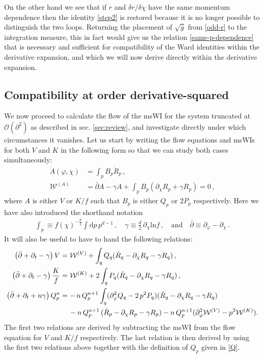 \documentclass[11pt]{book}
\numberwithin{equation}{chapter}
\begin{document}
On the other hand we see that if $\dot{r}$ and $\delta r/\delta\chi$ have the same momentum
dependence then the identity \eqref{step2} is restored because it is no longer possible
to distinguish the two loops.
Returning the placement of $\sqrt{\bar{g}}$ from \eqref{odd-r} to the integration measure,
this in fact would give us the relation \eqref{same-p-dependence} that is necessary and
sufficient for compatibility of the Ward identities within the derivative expansion,
and which we will now derive directly within the derivative expansion.


\subsection{Compatibility at order derivative-squared}\label{sec:compatibility-at-d2}

We now proceed to calculate the flow of the msWI for the system truncated
at $\mathcal{O}(\partial^2)$ as described in sec. \ref{sec:review},
and investigate directly under which circumstances it vanishes.
Let us start by writing the flow equations and msWIs for both $V$ and $K$ in the following form
so that we can study both cases simultaneously:
\begin{align}
	\label{flowA}
	\dot A(\varphi,\chi) &= \int_p B_p\dot R_p \,,\\
	\label{msWIA}
	\mathcal{W}^{(A)}&=\bar\partial A - \gamma A + \int_p B_p(\partial_\chi R_p + \gamma R_p)=0 \,,
\end{align}
where $A$ is either $V$ or $K/f$ such that $B_p$ is either $Q_p$ or $2 P_p$ respectively.
Here we have also introduced the shorthand notation
\begin{align}
  \label{gamma}
  \int_p \equiv f(\chi)^{-\frac{d}{2}} \int \mathrm dp \,p^{d-1} \,,
  \quad \gamma \equiv \frac{d}{2} \, \partial_\chi \mathrm{ln} f \,,
  \quad \text{and} \quad \bar\partial \equiv \partial_\varphi - \partial_\chi\,.
\end{align}
It will also be useful to have to hand the following relations:
\begin{align}
	\label{DV}
	\left( \bar \partial + \partial_t - \gamma \right) V &=
	\mathcal W^{(V)} + \int_q Q_q (\dot R_q - \partial_{\chi} R_q - \gamma R_q)\,,\\
	\label{DK}
	\left( \bar \partial + \partial_t - \gamma \right) \frac{K}{f} &=
	\mathcal W^{(K)} + 2 \int_q P_q (\dot R_q - \partial_{\chi} R_q - \gamma R_q)\,,\\
	\label{DQ}
	\left( \bar \partial + \partial_t + n \gamma \right) Q_p^n &=
	- \, n \, Q_p^{n+1} \int_q (\partial_{\varphi}^2 Q_q - 2 \, p^2 P_q)(\dot R_q - \partial_{\chi} R_q
	 - \gamma R_q)\nonumber\\
   &\hspace{4.2mm}-n \, Q_p^{n+1} \, (\dot R_p - \partial_{\chi} R_p - \gamma R_p)
	-n \, Q_p^{n+1} (\partial_{\varphi}^2 \mathcal W^{(V)} - p^2 \mathcal W^{(K)}).
\end{align}
The first two relations are derived by subtracting the msWI from the flow equation for
$V$ and $K/f$ respectively. The last relation is then derived by using the first two relations
above together with the definition of $Q_p$ given in \eqref{Q}.
\end{document}
